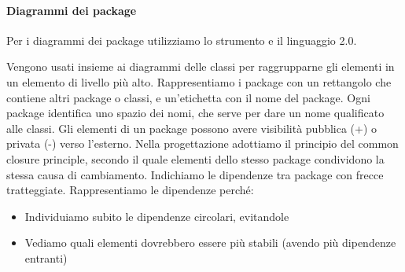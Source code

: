 		\paragraph{Diagrammi dei package}\label{PP:Sviluppo:DiagrammiPackage}
        Per i diagrammi dei package utilizziamo lo strumento  e il linguaggio  2.0.\par
        Vengono usati insieme ai diagrammi delle classi per raggrupparne gli elementi in un elemento di livello più alto.
        Rappresentiamo i package con un rettangolo che contiene altri package o classi, e un'etichetta con il nome del package.
        Ogni package identifica uno spazio dei nomi, che serve per dare un nome qualificato alle classi.
        Gli elementi di un package possono avere visibilità pubblica (+) o privata (-) verso l'esterno.
		Nella progettazione adottiamo il principio del common closure principle, secondo il quale elementi dello stesso
		package condividono la stessa causa di cambiamento.
        Indichiamo le dipendenze tra package con frecce tratteggiate.
        Rappresentiamo le dipendenze perché:
        \begin{itemize}
            \item Individuiamo subito le dipendenze circolari, evitandole
            \item Vediamo quali elementi dovrebbero essere più stabili (avendo più dipendenze entranti)
        \end{itemize}

